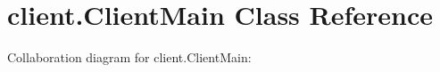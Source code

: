 \hypertarget{classclient_1_1_client_main}{}\section{client.\+Client\+Main Class Reference}
\label{classclient_1_1_client_main}


Collaboration diagram for client.\+Client\+Main\+:
